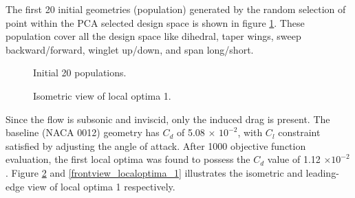 The first 20 initial geometries (population) generated by the random selection of point within the PCA selected design space is shown in figure \ref{initial_population}. These population cover all the design space like dihedral, taper wings, sweep backward/forward, winglet up/down, and span long/short.

\begin{figure}[!htbp]
    \centering
    \caption{Initial 20 populations.}
    \label{initial_population}
\end{figure}

\begin{figure}[!htbp]
    \centering
    \caption{Isometric view of local optima 1.}
    \label{isoview_localoptima_1}
\end{figure}

Since the flow is subsonic and inviscid, only the induced drag is present. The baseline (NACA 0012) geometry has $C_d$ of 5.08 $\times$ $10^{-2}$, with $C_l$ constraint satisfied by adjusting the angle of attack. After 1000 objective function evaluation, the first local optima was found to possess the $C_d$ value of 1.12 $\times 10^{-2}$. Figure \ref{isoview_localoptima_1} and \ref{frontview_localoptima_1} illustrates the isometric and leading-edge view of local optima 1 respectively.

